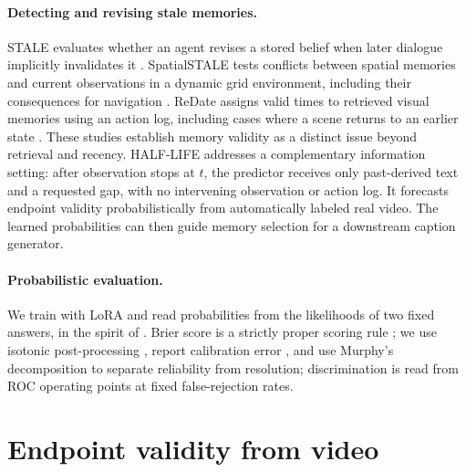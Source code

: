 \documentclass[10pt]{article}
\begin{document}
\paragraph{Detecting and revising stale memories.} STALE evaluates whether an agent revises a stored belief when later dialogue implicitly invalidates it \citep{chao2026stale}. SpatialSTALE tests conflicts between spatial memories and current observations in a dynamic grid environment, including their consequences for navigation \citep{sun2026memorylies}. ReDate assigns valid times to retrieved visual memories using an action log, including cases where a scene returns to an earlier state \citep{wang2026oldisnotfalse}. These studies establish memory validity as a distinct issue beyond retrieval and recency. HALF-LIFE addresses a complementary information setting: after observation stops at $t$, the predictor receives only past-derived text and a requested gap, with no intervening observation or action log. It forecasts endpoint validity probabilistically from automatically labeled real video. The learned probabilities can then guide memory selection for a downstream caption generator.

\paragraph{Probabilistic evaluation.} We train with LoRA \citep{hu2022lora} and read probabilities from the likelihoods of two fixed answers, in the spirit of \citet{kadavath2022language}. Brier score is a strictly proper scoring rule \citep{brier1950verification,gneiting2007strictly}; we use isotonic post-processing \citep{zadrozny2002transforming}, report calibration error \citep{guo2017calibration}, and use Murphy's decomposition \citep{murphy1973new} to separate reliability from resolution; discrimination is read from ROC operating points at fixed false-rejection rates.

\section{Endpoint validity from video}
\label{sec:labels}
\end{document}
